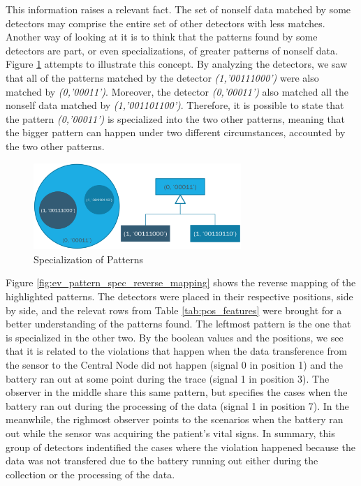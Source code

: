 This information raises a relevant fact. The set of nonself data matched by some detectors may comprise the entire set of other detectors with less matches. Another way of looking at it is to think that the patterns found by some detectors are part, or even specializations, of greater patterns of nonself data. Figure \ref{fig:ev_pattern_spec} attempts to illustrate this concept. By analyzing the detectors, we saw that all of the patterns matched by the detector \textit{(1,'00111000')} were also matched by \textit{(0,'00011')}. Moreover, the detector \textit{(0,'00011')} also matched all the nonself data matched by \textit{(1,'001101100')}. Therefore, it is possible to state that the pattern \textit{(0,'00011')} is specialized into the two other patterns, meaning that the bigger pattern can happen under two different circumstances, accounted by the two other patterns.

\begin{figure}[]
	\centering
	\includegraphics[width=0.7\textwidth, keepaspectratio]{img/pattern_specialization.png}
	\caption{Specialization of Patterns}
	\label{fig:ev_pattern_spec}
\end{figure}

Figure \ref{fig:ev_pattern_spec_reverse_mapping} shows the reverse mapping of the highlighted patterns. The detectors were placed in their respective positions, side by side, and the relevat rows from Table \ref{tab:pos_features} were brought for a better understanding of the patterns found. The leftmost pattern is the one that is specialized in the other two. By the boolean values and the positions, we see that it is related to the violations that happen when the data transference from the sensor to the Central Node did not happen (signal 0 in position 1) and the battery ran out at some point during the trace (signal 1 in position 3). The observer in the middle share this same pattern, but specifies the cases when the battery ran out during the processing of the data (signal 1 in position 7). In the meanwhile, the righmost observer points to the scenarios when the battery ran out while the sensor was acquiring the patient's vital signs. In summary, this group of detectors indentified the cases where the violation happened because the data was not transfered due to the battery running out either during the collection or the processing of the data.


